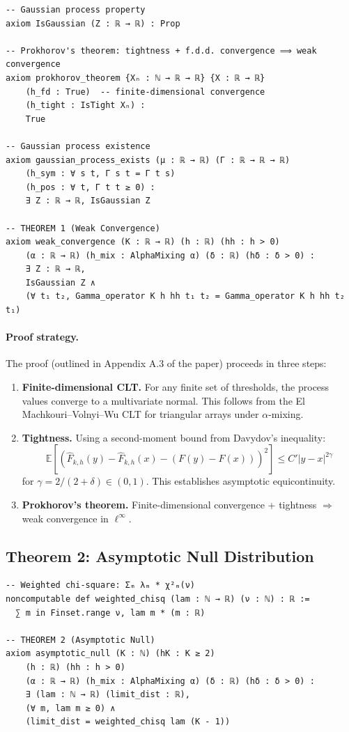 \documentclass[11pt,a4paper]{article}
\theoremstyle{definition}
\begin{document}
\begin{lstlisting}[caption={Theorem 1: Weak Convergence}]
-- Gaussian process property
axiom IsGaussian (Z : ℝ → ℝ) : Prop

-- Prokhorov's theorem: tightness + f.d.d. convergence ⟹ weak convergence
axiom prokhorov_theorem {Xₙ : ℕ → ℝ → ℝ} {X : ℝ → ℝ}
    (h_fd : True)  -- finite-dimensional convergence
    (h_tight : IsTight Xₙ) :
    True

-- Gaussian process existence
axiom gaussian_process_exists (μ : ℝ → ℝ) (Γ : ℝ → ℝ → ℝ)
    (h_sym : ∀ s t, Γ s t = Γ t s)
    (h_pos : ∀ t, Γ t t ≥ 0) :
    ∃ Z : ℝ → ℝ, IsGaussian Z

-- THEOREM 1 (Weak Convergence)
axiom weak_convergence (K : ℝ → ℝ) (h : ℝ) (hh : h > 0)
    (α : ℝ → ℝ) (h_mix : AlphaMixing α) (δ : ℝ) (hδ : δ > 0) :
    ∃ Z : ℝ → ℝ,
    IsGaussian Z ∧
    (∀ t₁ t₂, Gamma_operator K h hh t₁ t₂ = Gamma_operator K h hh t₂ t₁)
\end{lstlisting}

\paragraph{Proof strategy.} The proof (outlined in Appendix A.3 of the paper) proceeds in three steps:

\begin{enumerate}
\item \textbf{Finite-dimensional CLT.} For any finite set of thresholds, the process values converge to a multivariate normal. This follows from the El Machkouri--Volnyi--Wu CLT for triangular arrays under $\alpha$-mixing.

\item \textbf{Tightness.} Using a second-moment bound from Davydov's inequality:
\[
\mathbb{E}[(\hat{F}_{k,h}(y) - \hat{F}_{k,h}(x) - (F(y) - F(x)))^2] \leq C'|y - x|^{2\gamma}
\]
for $\gamma = 2/(2+\delta) \in (0,1)$. This establishes asymptotic equicontinuity.

\item \textbf{Prokhorov's theorem.} Finite-dimensional convergence + tightness $\Rightarrow$ weak convergence in $\ell^\infty$.
\end{enumerate}

\subsection{Theorem 2: Asymptotic Null Distribution}

\begin{lstlisting}[caption={Weighted Chi-Square Distribution}]
-- Weighted chi-square: Σₘ λₘ * χ²ₘ(ν)
noncomputable def weighted_chisq (lam : ℕ → ℝ) (ν : ℕ) : ℝ :=
  ∑ m in Finset.range ν, lam m * (m : ℝ)

-- THEOREM 2 (Asymptotic Null)
axiom asymptotic_null (K : ℕ) (hK : K ≥ 2)
    (h : ℝ) (hh : h > 0)
    (α : ℝ → ℝ) (h_mix : AlphaMixing α) (δ : ℝ) (hδ : δ > 0) :
    ∃ (lam : ℕ → ℝ) (limit_dist : ℝ),
    (∀ m, lam m ≥ 0) ∧
    (limit_dist = weighted_chisq lam (K - 1))
\end{lstlisting}
\end{document}
